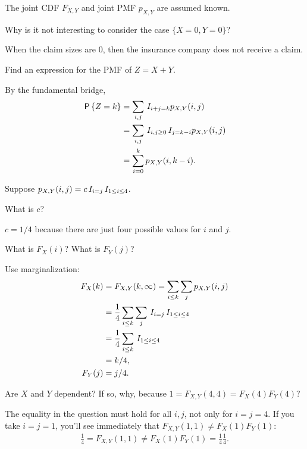 \documentclass[lectures-questions]{subfiles}
\begin{document}
The joint CDF $F_{X,Y}$ and joint PMF $p_{X,Y}$ are assumed known.

\begin{exercise}
Why is it not interesting to consider the case $\{X=0, Y=0\}$?
\begin{solution}
When the claim sizes are $0$, then the insurance company does not receive a claim.
\end{solution}
\end{exercise}


\begin{exercise}
Find an expression for the PMF of $Z=X+Y$.
\begin{solution}
By the fundamental bridge,
\begin{align}
\,\mathsf{P}\left\{Z=k\right\}
&= \sum_{i,j} \,I_{i+j=k} p_{X,Y}(i,j) \\
&= \sum_{i,j} \,I_{i, j \geq 0} \,I_{j=k-i} p_{X,Y}(i,j) \\
&= \sum_{i=0}^{k} p_{X,Y}(i,k-i).
\end{align}
\end{solution}
\end{exercise}

Suppose $p_{X,Y}(i,j) = c \,I_{i=j}\,I_{1\leq i \leq 4}$.


\begin{exercise}
What is $c$?
\begin{solution}
$c=1/4$ because there are just four possible values for $i$ and $j$.
\end{solution}
\end{exercise}

\begin{exercise}
What is $F_{X}(i)$?
What is $F_{Y}(j)$?
\begin{solution}
Use marginalization:
\begin{align}
F_X(k) &=  F_{X,Y}(k, \infty ) = \sum_{i\leq k} \sum_j p_{X,Y}(i,j) \\
 &= \frac{1}{4}\sum_{i\leq k} \sum_j \,I_{i=j}\,I_{1\leq i \leq 4}\\
 &= \frac{1}{4}\sum_{i\leq k} \,I_{1\leq i \leq 4} \\
&=k/4,\\
F_Y(j) &= j/4.
\end{align}
\end{solution}
\end{exercise}


\begin{exercise}
Are $X$ and $Y$ dependent?  If so, why, because $1=F_{X,Y}(4,4)= F_X(4)F_Y(4)$?
\begin{solution}
  The equality in the question must hold for all $i,j$, not only for $i=j=4$.
  If you take $i=j=1$, you'll see immediately that $F_{X,Y}(1,1)\neq F_X(1)F_Y(1)$:
  \begin{align}
    \label{eq:823}
    \frac{1}{4} = F_{X,Y}(1,1) \neq F_{X}(1) F_Y(1) = \frac{1}{4}\frac{1}{4}.
  \end{align}
\end{solution}
\end{exercise}
\end{document}
